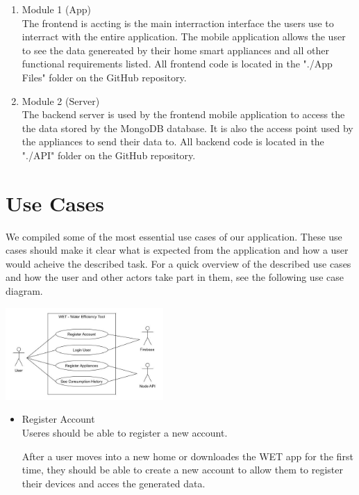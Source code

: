 \documentclass[10pt]{article}
\begin{document}
\begin{multicols*}{2}
\begin{enumerate}
  \item {Module 1 (App)} \\
  The frontend is accting is the main interraction interface the users use to interract with the entire application. The mobile application allows the user to see the data genereated by their home smart appliances and all other functional requirements listed.
  All frontend code is located in the "./App Files" folder on the GitHub repository.
  \item {Module 2 (Server)} \\
  The backend server is used by the frontend mobile application to access the the data stored by the MongoDB database. It is also the access point used by the appliances to send their data to.
  All backend code is located in the "./API" folder on the GitHub repository.
\end{enumerate}

\clearpage

\section{Use Cases}

We compiled some of the most essential use cases of our application. These use cases should make it clear what is expected from the application and how a user would acheive the described task.
For a quick overview of the described use cases and how the user and other actors take part in them, see the following use case diagram.

\begin{center}
  \includegraphics[max width=6cm]{uml/usecase_diagram}
\end{center}

\begin{itemize}
  \item {Register Account} \\
  Useres should be able to register a new account.
  
  After a user moves into a new home or downloades the WET app for the first time, they should be able to create a new account to allow them to register their devices and acces the generated data.
 

\end{itemize}
\end{multicols*}
\end{document}
